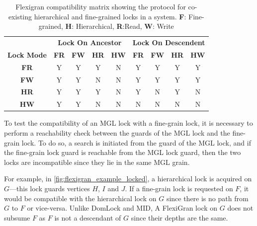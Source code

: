 \begin{table}[h]
    \centering
    \captionsetup{justification=centering}
    \begin{tabular}{c|cccc|cccc|}
        \multicolumn{1}{c}{} & \multicolumn{4}{c|}{\textbf{Lock On Ancestor}} & \multicolumn{4}{c}{\textbf{Lock On Descendent}} \\
        \cline{2-9}
        \textbf{Lock Mode} & \textbf{FR} & \textbf{FW} & \textbf{HR} & \textbf{HW} & \textbf{FR} & \textbf{FW} & \textbf{HR} & \textbf{HW} \\
        \hline
        \textbf{FR} & \cellcolor{green!25} Y & \cellcolor{green!25} Y & \cellcolor{green!25} Y & \cellcolor{red!25} N & \cellcolor{green!25} Y & \cellcolor{green!25} Y & \cellcolor{green!25} Y & \cellcolor{green!25} Y \\
        \textbf{FW} & \cellcolor{green!25} Y & \cellcolor{green!25} Y & \cellcolor{red!25} N & \cellcolor{red!25} N & \cellcolor{green!25} Y & \cellcolor{green!25} Y & \cellcolor{green!25} Y & \cellcolor{green!25} Y \\
        \textbf{HR} & \cellcolor{green!25} Y & \cellcolor{green!25} Y & \cellcolor{green!25} Y & \cellcolor{red!25} N & \cellcolor{green!25} Y & \cellcolor{red!25} N & \cellcolor{green!25} Y & \cellcolor{red!25} N \\
        \textbf{HW} & \cellcolor{green!25} Y & \cellcolor{green!25} Y & \cellcolor{red!25} N & \cellcolor{red!25} N & \cellcolor{red!25} N & \cellcolor{red!25} N & \cellcolor{red!25} N & \cellcolor{red!25} N \\
    \end{tabular}
    \caption{Flexigran compatibility matrix showing the protocol for co-existing hierarchical and fine-grained locks in a system. \textbf{F}: Fine-grained, \textbf{H}: Hierarchical, \textbf{R}:Read, \textbf{W}: Write}
    \label{tab:flexigran_locks}
\end{table}

To test the compatibility of an MGL lock with a fine-grain lock, it is necessary to perform a reachability check between the guards of the MGL lock and the fine-grain lock. To do so, a search is initiated from the guard of the MGL lock, and if the fine-grain lock guard is reachable from the MGL lock guard, then the two locks are incompatible since they lie in the same MGL grain. 

For example, in \cref{fig:flexigran_example_locked}, a hierarchical lock is acquired on $G$—this lock guards vertices $H$, $I$ and $J$. If a fine-grain lock is requested on $F$, it would be compatible with the hierarchical lock on $G$ since there is no path from $G$ to $F$ or vice-versa. Unlike DomLock and MID, A FlexiGran lock on $G$ does not subsume $F$ as $F$ is not a descendant of $G$ since their depths are the same.

